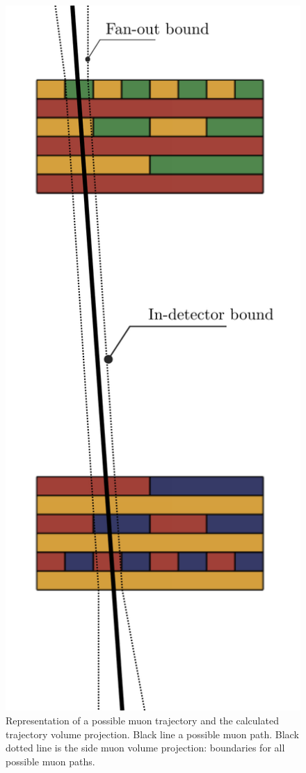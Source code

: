 \begin{figure}[h]
    \centering
    \includegraphics[scale=0.85]{figures/fig3_cropped.png}
    \caption{Representation of a possible muon trajectory and the calculated trajectory volume projection. Black line a possible muon path. Black dotted line is the side muon volume projection: boundaries for all possible muon paths.
}
    \label{fig3}
\end{figure}


